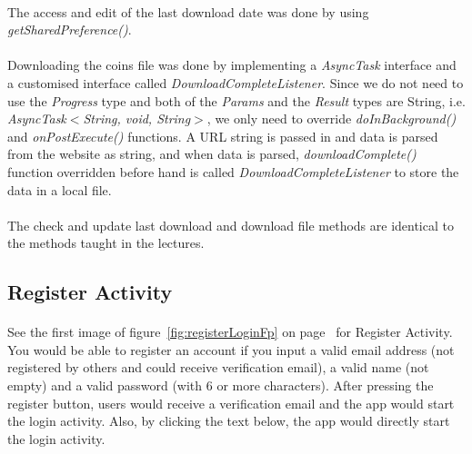 \documentclass[12pt]{article}
\begin{document}
\paragraph{}
The access and edit of the last download date was done by using \textit{getSharedPreference()}.
\paragraph{}
Downloading the coins file was done by implementing a \textit{AsyncTask} interface and a customised interface called \textit{DownloadCompleteListener}. Since we do not need to use the \textit{Progress} type and both of the \textit{Params} and the \textit{Result} types are String, i.e. \textit{AsyncTask$<$String, void, String$>$}, we only need to override \textit{doInBackground()} and \textit{onPostExecute()} functions. A URL string is passed in and data is parsed from the website as string, and when data is parsed, \textit{downloadComplete()} function overridden before hand is called \textit{DownloadCompleteListener} to store the data in a local file.
\paragraph{}
The check and update last download and download file methods are identical to the methods taught in the lectures. 

\subsection{Register Activity}
\paragraph{}
See the first image of figure~\ref{fig:registerLoginFp} on page~\pageref{fig:registerLoginFp} for Register Activity. You would be able to register an account if you input a valid email address (not registered by others and could receive verification email), a valid name (not empty) and a valid password (with 6 or more characters). After pressing the register button, users would receive a verification email and the app would start the login activity. Also, by clicking the text below, the app would directly start the login activity.
\end{document}
